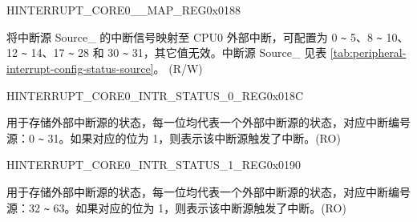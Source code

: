 \begin{register}{H}{INTERRUPT\_CORE0\_\_MAP\_REG}{0x{}0188}\label{regdesc:INTERRUPTCORE0DMAEXTMEMREJECTINTMAPREG}
%
%
\regnewline%
\begin{regdesc}\begin{reglist}
\item [INTERRUPT\_CORE0\_SOURCE\_\regindex{Y}\_MAP] 将中断源 Source\_ 的中断信号映射至 CPU0 外部中断，可配置为 0 \verb+~+ 5、8 \verb+~+ 10、12 \verb+~+ 14、17 \verb+~+ 28 和 30 \verb+~+ 31，其它值无效。中断源 Source\_ 见表 \ref{tab:peripheral-interrupt-config-status-source}。 (R/W)
\end{reglist}\end{regdesc}
\end{register} 

\begin{register}{H}{INTERRUPT\_CORE0\_INTR\_STATUS\_0\_REG}{0x{}018C}\label{regdesc:INTERRUPTCORE0INTRSTATUS0REG}
%
\regnewline%
\begin{regdesc}\begin{reglist}
\label{fielddesc:INTERRUPTCORE0INTRSTATUS0}\item [INTERRUPT\_CORE0\_INTR\_STATUS\_0] 用于存储外部中断源的状态，每一位均代表一个外部中断源的状态，对应中断编号源：0 \verb+~+ 31。如果对应的位为 1，则表示该中断源触发了中断。(RO)
\end{reglist}\end{regdesc}
\end{register}


\begin{register}{H}{INTERRUPT\_CORE0\_INTR\_STATUS\_1\_REG}{0x{}0190}\label{regdesc:INTERRUPTCORE0INTRSTATUS1REG}
%
\regnewline%
\begin{regdesc}\begin{reglist}
\label{fielddesc:INTERRUPTCORE0INTRSTATUS1}\item [INTERRUPT\_CORE0\_INTR\_STATUS\_1] 用于存储外部中断源的状态，每一位均代表一个外部中断源的状态，对应中断编号源：32 \verb+~+ 63。如果对应的位为 1，则表示该中断源触发了中断。(RO)
\end{reglist}\end{regdesc}
\end{register}


